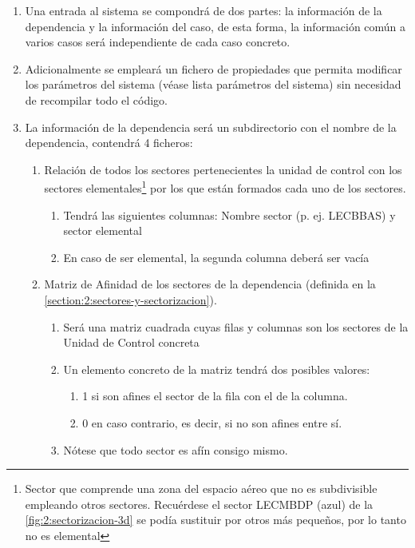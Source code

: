 \begin{enumerate}[label={\textbf{RIO\arabic*}}, ref={RIO\arabic*},  align=left]
	
	\item  Una entrada al sistema se compondrá de dos partes: la información de la dependencia y la información del caso, de esta forma, la información común a varios casos será independiente de cada caso concreto.
	
	\item Adicionalmente se empleará un fichero de propiedades que permita modificar los parámetros del sistema (véase lista parámetros del sistema) %
	sin necesidad de recompilar todo el código.	
	
	\item La información de la dependencia será un subdirectorio con el nombre de la dependencia, contendrá 4 ficheros:
	\begin{enumerate}[label*={\textbf{.\arabic*}}]
		\item  Relación de todos los sectores pertenecientes la unidad de control con los sectores elementales\footnote{
			Sector que comprende una zona del espacio aéreo que no es subdivisible empleando otros sectores. Recuérdese el sector LECMBDP (azul) de la \autoref{fig:2:sectorizacion-3d} se podía sustituir por otros más pequeños, por lo tanto no es elemental
		} por los que están formados cada uno de los sectores.
		\begin{enumerate}[label*={\textbf{.\arabic*}}]
			\item Tendrá las siguientes columnas: Nombre sector (p. ej. LECBBAS) y sector elemental
			\item En caso de ser elemental, la segunda columna deberá ser vacía
		\end{enumerate}

		\item  Matriz de Afinidad de los sectores de la dependencia (definida en la \autoref{section:2:sectores-y-sectorizacion}).
		\begin{enumerate}[label*={\textbf{.\arabic*}}]
			\item Será una matriz cuadrada cuyas filas y columnas son los sectores de la Unidad de Control concreta
			\item Un elemento concreto de la matriz tendrá dos posibles valores:
			\begin{enumerate}[label*={\textbf{.\arabic*}}]
				\item 1 si son afines el sector de la fila con el de la columna.
				\item 0 en caso contrario, es decir, si no son afines entre sí.
			\end{enumerate}
			\item Nótese que todo sector es afín consigo mismo.
		\end{enumerate}
	

\end{enumerate}
\end{enumerate}

